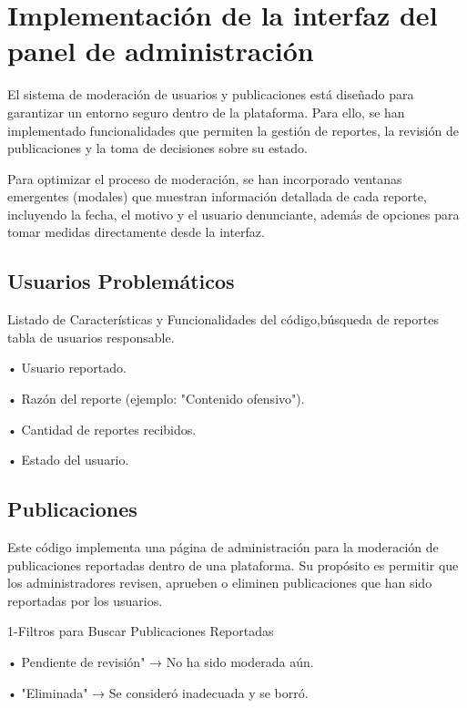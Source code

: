 \documentclass[11pt, a4paper, oneside]{book}
\begin{document}
\chapter{ Implementación de la interfaz del panel de administración }

El sistema de moderación de usuarios y publicaciones está diseñado para garantizar un entorno seguro dentro de la plataforma. Para ello, se han implementado funcionalidades que permiten la gestión de reportes, la revisión de publicaciones y la toma de decisiones sobre su estado.

\hspace{2cm}

Para optimizar el proceso de moderación, se han incorporado ventanas emergentes (modales) que muestran información detallada de cada reporte, incluyendo la fecha, el motivo y el usuario denunciante, además de opciones para tomar medidas directamente desde la interfaz.

\section{Usuarios Problemáticos }

Listado de Características y Funcionalidades del código,búsqueda de reportes tabla de usuarios responsable.


• Usuario reportado.

• Razón del reporte (ejemplo: "Contenido ofensivo").

• Cantidad de reportes recibidos.

• Estado del usuario. 

\hspace{6cm}

\section{Publicaciones } 

Este código implementa una página de administración para la moderación de publicaciones reportadas dentro de una plataforma. Su propósito es permitir que los
administradores revisen, aprueben o eliminen publicaciones que han sido reportadas por los usuarios. 



1-Filtros para Buscar Publicaciones Reportadas



• Pendiente de revisión" → No ha sido moderada aún. 


• "Eliminada" → Se consideró inadecuada y se borró.
\end{document}
